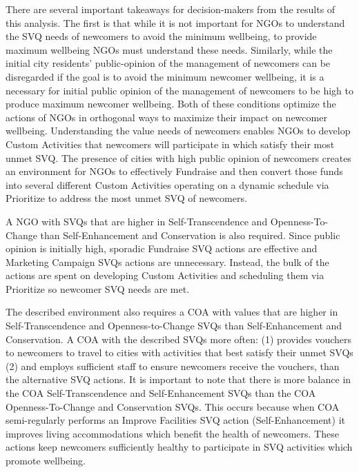 \documentclass{scspaperproc}
\theoremstyle{scsthe}
\begin{document}
There are several important takeaways for decision-makers from the results of this analysis. The first is that while it is not important for NGOs to understand the SVQ needs of newcomers to avoid the minimum wellbeing, to provide maximum wellbeing NGOs must understand these needs. Similarly, while the initial city residents' public-opinion of the management of newcomers can be disregarded if the goal is to avoid the minimum newcomer wellbeing, it is a necessary for initial public opinion of the management of newcomers to be high to produce maximum newcomer wellbeing. Both of these conditions optimize the actions of NGOs in orthogonal ways to maximize their impact on newcomer wellbeing. Understanding the value needs of newcomers enables NGOs to develop Custom Activities that newcomers will participate in which satisfy their most unmet SVQ. The presence of cities with high public opinion of newcomers creates an environment for NGOs to effectively Fundraise and then convert those funds into several different Custom Activities operating on a dynamic schedule via Prioritize to address the most unmet SVQ of newcomers. 

A NGO with SVQs that are higher in Self-Transcendence and Openness-To-Change than Self-Enhancement and Conservation is also required. Since public opinion is initially high, sporadic Fundraise SVQ actions are effective and Marketing Campaign SVQs actions are unnecessary. Instead, the bulk of the actions are spent on developing Custom Activities and scheduling them via Prioritize so newcomer SVQ needs are met. 

The described environment also requires a COA with values that are higher in Self-Transcendence and Openness-to-Change SVQs than Self-Enhancement and Conservation. A COA with the described SVQs more often: (1) provides vouchers to newcomers to travel to cities with activities that best satisfy their unmet SVQs (2) and employs sufficient staff to ensure newcomers receive the vouchers, than the alternative SVQ actions. It is important to note that there is more balance in the COA Self-Transcendence and Self-Enhancement SVQs than the COA Openness-To-Change and Conservation SVQs. This occurs because when COA semi-regularly performs an Improve Facilities SVQ action (Self-Enhancement) it improves living accommodations which benefit the health of newcomers. These actions keep newcomers sufficiently healthy to participate in SVQ activities which promote wellbeing.  
\end{document}
